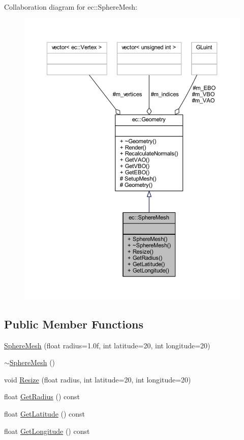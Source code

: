 Collaboration diagram for ec\+:\+:Sphere\+Mesh\+:\nopagebreak
\begin{figure}[H]
\begin{center}
\leavevmode
\includegraphics[width=350pt]{classec_1_1_sphere_mesh__coll__graph}
\end{center}
\end{figure}
\subsection*{Public Member Functions}
\begin{DoxyCompactItemize}
\item 
\mbox{\hyperlink{classec_1_1_sphere_mesh_aef9a67fadbe115ae17af30d5f07c232d}{Sphere\+Mesh}} (float radius=1.\+0f, int latitude=20, int longitude=20)
\item 
\mbox{\hyperlink{classec_1_1_sphere_mesh_ac2d7dd9ad61b5061644259f4c84df00b}{$\sim$\+Sphere\+Mesh}} ()
\item 
void \mbox{\hyperlink{classec_1_1_sphere_mesh_a11a1d25477d5e65603efc7fd36a4056c}{Resize}} (float radius, int latitude=20, int longitude=20)
\item 
float \mbox{\hyperlink{classec_1_1_sphere_mesh_aefa0c1d8caab82b0a36e099e43008032}{Get\+Radius}} () const
\item 
float \mbox{\hyperlink{classec_1_1_sphere_mesh_ab4379e6b27a1375a4b4994f53318f6b5}{Get\+Latitude}} () const
\item 
float \mbox{\hyperlink{classec_1_1_sphere_mesh_af6cc3be0f4584a93dcd3b82e93e48392}{Get\+Longitude}} () const
\end{DoxyCompactItemize}
